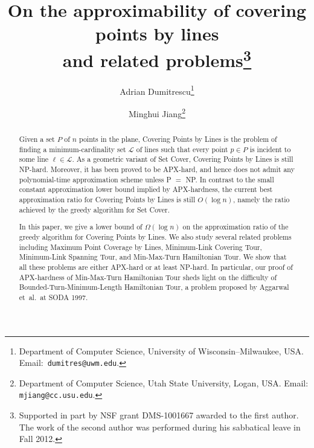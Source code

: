 \documentclass[letterpaper,11pt]{article}
\def\L{{\mathcal L}}
\newcommand{\later}[1]{}
\begin{document}
\title{On the approximability of covering points by lines\\and related
  problems\thanks{Supported in part by NSF grant DMS-1001667 awarded to the first author.
The work of the second author was performed during his sabbatical leave
in Fall 2012.}}

\author{Adrian Dumitrescu\thanks{Department of Computer Science,
University of Wisconsin--Milwaukee, USA\@.
Email:~\texttt{dumitres@uwm.edu}.}
\and
Minghui Jiang\thanks{Department of Computer Science,
Utah State University,
Logan, USA\@.
Email: \texttt{mjiang@cc.usu.edu}.}}

\maketitle
\thispagestyle{empty}


\begin{abstract}
Given a set $P$ of $n$ points in the plane, {\sc Covering Points by Lines}
is the problem of finding a minimum-cardinality set $\L$ of lines
such that every point $p \in P$ is incident to some line $\ell \in \L$.
As a geometric variant of {\sc Set Cover}, {\sc Covering Points by Lines} 
is still NP-hard. 
Moreover, it has been proved to be APX-hard, and hence
does not admit any polynomial-time approximation scheme unless P $=$ NP\@.
In contrast to the small constant approximation lower bound
implied by APX-hardness,
the current best approximation ratio for {\sc Covering Points by Lines} 
is still $O(\log n)$, namely the ratio achieved by the greedy
algorithm for {\sc Set Cover}.

In this paper,
we give a lower bound of $\Omega(\log n)$
on the approximation ratio of the greedy algorithm for {\sc Covering Points by Lines}.
We also study several related problems including
{\sc Maximum Point Coverage by Lines},
{\sc Minimum-Link Covering Tour},
{\sc Minimum-Link Spanning Tour},
and {\sc Min-Max-Turn Hamiltonian Tour}.
We show that all these problems are either APX-hard or at least NP-hard.
In particular, our proof of APX-hardness of {\sc Min-Max-Turn Hamiltonian Tour}
sheds light on the difficulty of {\sc Bounded-Turn-Minimum-Length Hamiltonian Tour},
a problem proposed by Aggarwal et~al.\ at SODA 1997.

\later{
\medskip
\medskip
\textbf{\small Keywords}:
Spanning tours,
Covering tours,
NP-hardness,
APX-hardness.
}

\end{abstract}

\newpage
\setcounter{page}{1}
\setcounter{footnote}{0}
\end{document}
